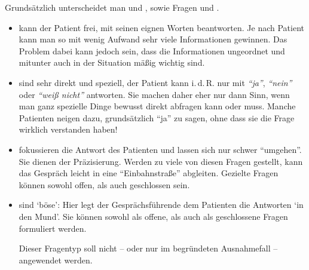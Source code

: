 {
Grundsätzlich unterscheidet man  und
, sowie  Fragen und
.

\begin{itemize}
  \item {} kann der Patient frei, mit
  seinen eignen Worten beantworten. Je nach Patient kann man so
  mit wenig Aufwand sehr viele Informationen gewinnen. Das
  Problem dabei kann jedoch sein, dass die Informationen
  ungeordnet und mitunter auch in der Situation mäßig wichtig
  sind.
  
  \begin{quote}
    
  \end{quote}
  
  
  \item {} sind sehr direkt und
  speziell, der Patient kann i.\,d.\,R. nur mit
  \emph{\enquote{ja}}, \emph{\enquote{nein}} oder
  \emph{\enquote{weiß nicht}} antworten. Sie machen daher
  eher nur dann Sinn, wenn man ganz spezielle Dinge bewusst
  direkt abfragen kann oder muss.  Manche
  Patienten neigen dazu, grundsätzlich \enquote{ja} zu
  sagen, ohne dass sie die Frage wirklich verstanden haben!
  
  \begin{quote}
    
  \end{quote}
  
  \item {} fokussieren die Antwort des
  Patienten und
  lassen sich nur schwer \enquote{umgehen}. Sie dienen der
  Präzisierung. Werden zu
  viele von diesen Fragen gestellt, kann das Gespräch leicht
  in eine \enquote{Einbahnstraße} abgleiten. Gezielte Fragen können
  sowohl offen, als auch geschlossen sein.
  \begin{quote}
  \end{quote}
  
  \item {} sind \enquote*{böse}: Hier
  legt der Gesprächsführende dem Patienten die Antworten \enquote*{in
  den Mund}. Sie können sowohl als offene, als auch als
  geschlossene Fragen formuliert werden.
  
  \begin{quote}
    
  \end{quote}
  
  Dieser Fragentyp soll nicht -- oder nur im begründeten
  Ausnahmefall -- angewendet werden.
\end{itemize}



}
